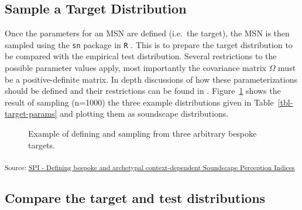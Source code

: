 \documentclass[
  authoryear,
  preprint,
  3p]{elsarticle}
\begin{document}
\subsection{Sample a Target
Distribution}\label{sample-a-target-distribution}

Once the parameters for an MSN are defined (i.e.~the target), the MSN is
then sampled using the \texttt{sn} package \citep{Azzalini2021R} in
\texttt{R} \citep{RCT2018R}. This is to prepare the target distribution
to be compared with the empirical test distribution. Several
restrictions to the possible parameter values apply, most importantly
the covariance matrix \(\Omega\) must be a positive-definite matrix. In
depth discussions of how these parameterizations should be defined and
their restrictions can be found in \citet{Azzalini2016How}.
Figure~\ref{fig-targets} shows the result of sampling (n=1000) the three
example distributions given in Table~\ref{tbl-target-params} and
plotting them as soundscape distributions.

\begin{figure}[H]


\caption{\label{fig-targets}Example of defining and sampling from three
arbitrary bespoke targets.}

\end{figure}%

\textsubscript{Source:
\href{https://MitchellAcoustics.github.io/J2401_JASA_SSID-Single-Index/notebooks/SingleIndex-Code.ipynb.html\#cell-fig-targets}{SPI
- Defining bespoke and archetypal context-dependent Soundscape
Perception Indices}}

\subsection{Compare the target and test
distributions}\label{compare-the-target-and-test-distributions}
\end{document}

